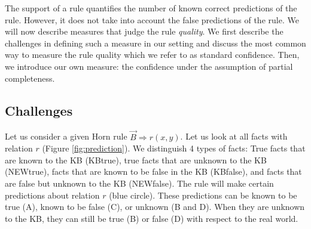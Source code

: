 
\label{sec:experimentsPCA}





The support of a rule quantifies the number of known correct predictions of the rule. 
However, it does not take into account the false predictions of the rule.
We will now describe measures that judge the rule \emph{quality}.
We first describe the challenges in defining such a measure in our setting 
and discuss the most common way to measure the rule quality which we refer to as standard confidence.
Then, we introduce our own measure: the confidence under the assumption of partial completeness.




\subsection{Challenges}
Let us consider a given Horn rule $\vec{B} \Rightarrow r(x,y)$. Let us look at all facts with relation $r$ (Figure \ref{fig:prediction}).
We distinguish 4 types of facts: True facts that are known to the KB (KBtrue), true facts that are unknown to the KB (NEWtrue),
facts that are known to be false in the KB (KBfalse), and facts that are false but unknown to the KB (NEWfalse).
The rule will make certain predictions about relation $r$ (blue circle). These predictions can be known to be true (A), known to be false (C), or unknown (B and D).
When they are unknown to the KB, they can still be true (B) or false (D) with respect to the real world.\\

